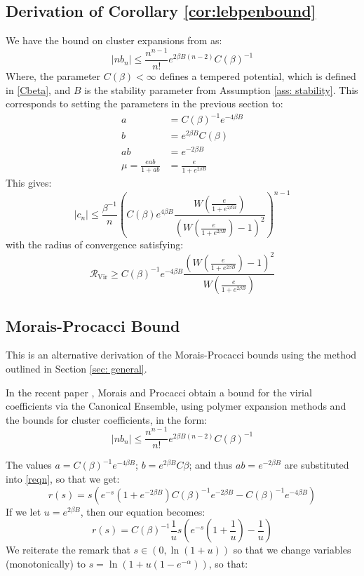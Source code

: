 \documentclass[reqno]{amsart}
\def\be{\begin{equation}}
\def\ee{\end{equation}}
\numberwithin{equation}{section}
\begin{document}
\subsection{Derivation of Corollary \ref{cor:lebpenbound}}
We have the bound on cluster expansions from \cite{R69} as:
\be |nb_n| \leq \frac{n^{n-1}}{n!}e^{2\beta B(n-2)}C(\beta)^{-1} \ee
Where, the parameter $C(\beta)< \infty$ defines a tempered potential, which is defined in \eqref{Cbeta}, and $B$ is the stability parameter from Assumption \ref{ass: stability}. 
This corresponds to setting the parameters in the previous section to:
\begin{align} a &= C(\beta)^{-1}e^{-4\beta B} \\
b &= e^{2\beta B}C(\beta) \\
ab &= e^{-2\beta B} \\
\mu = \frac{eab}{1+ab} &= \frac{e}{1+e^{2\beta B}} 
\end{align}
This gives:
\be |c_n| \leq \frac{\beta^{-1}}{n}\left(C(\beta)e^{4\beta B} \frac{W\left(\frac{e}{1+e^{2\beta B}}\right)}{(W\left(\frac{e}{1+e^{2\beta B}}\right)-1)^2}\right)^{n-1} \ee
with the radius of convergence satisfying:
\be \mathcal{R}_{\text{Vir}} \geq C(\beta)^{-1}e^{-4\beta B}\frac{(W\left(\frac{e}{1+e^{2\beta B}}\right)-1)^2}{W\left(\frac{e}{1+e^{2\beta B}}\right)} \label{firstbound} \ee
\subsection{Morais-Procacci Bound}
This is an alternative derivation of the Morais-Procacci bounds using the method outlined in Section \ref{sec: general}.

In the recent paper \cite{MP13}, Morais and Procacci obtain a bound for the virial coefficients via the Canonical Ensemble, using polymer expansion methods and the bounds for cluster coefficients, in the form:
\be |nb_n| \leq \frac{n^{n-1}}{n!}e^{2\beta B(n-2)}C(\beta)^{-1} \ee


The values $a=C(\beta)^{-1}e^{-4\beta B}$; $b=e^{2 \beta B}C{\beta}$; and thus $ab=e^{-2\beta B}$ are substituted into \eqref{reqn}, so that we get:
\be r(s)=s(e^{-s}(1+e^{- 2\beta B})C(\beta)^{-1}e^{-2 \beta B}-C(\beta)^{-1}e^{-4\beta B}) \label{proceqn} \ee
If we let $u=e^{2\beta B}$, then our equation becomes:
\be r(s)=C(\beta)^{-1}\frac{1}{u}s(e^{-s}(1+\frac{1}{u})-\frac{1}{u}) \label{uform} \ee
We reiterate the remark that $s \in (0, \ln (1+u))$ so that we change variables (monotonically) to $s = \ln (1+u(1-e^{-\alpha}))$, so that:
\end{document}
